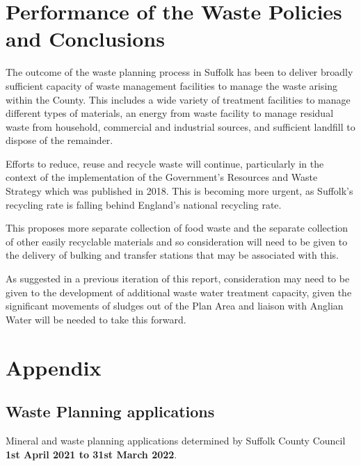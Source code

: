 \documentclass[
]{article}
\begin{document}
\hypertarget{performance-of-the-waste-policies-and-conclusions}{%
\section{Performance of the Waste Policies and
Conclusions}\label{performance-of-the-waste-policies-and-conclusions}}

The outcome of the waste planning process in Suffolk has been to deliver
broadly sufficient capacity of waste management facilities to manage the
waste arising within the County. This includes a wide variety of
treatment facilities to manage different types of materials, an energy
from waste facility to manage residual waste from household, commercial
and industrial sources, and sufficient landfill to dispose of the
remainder.

Efforts to reduce, reuse and recycle waste will continue, particularly
in the context of the implementation of the Government's Resources and
Waste Strategy which was published in 2018. This is becoming more
urgent, as Suffolk's recycling rate is falling behind England's national
recycling rate.

This proposes more separate collection of food waste and the separate
collection of other easily recyclable materials and so consideration
will need to be given to the delivery of bulking and transfer stations
that may be associated with this.

As suggested in a previous iteration of this report, consideration may
need to be given to the development of additional waste water treatment
capacity, given the significant movements of sludges out of the Plan
Area and liaison with Anglian Water will be needed to take this forward.

\newpage

\hypertarget{appendix}{%
\section{Appendix}\label{appendix}}

\hypertarget{waste-planning-applications}{%
\subsection{Waste Planning
applications}\label{waste-planning-applications}}

Mineral and waste planning applications determined by Suffolk County
Council \textbf{1st April 2021 to 31st March 2022}.
\end{document}
